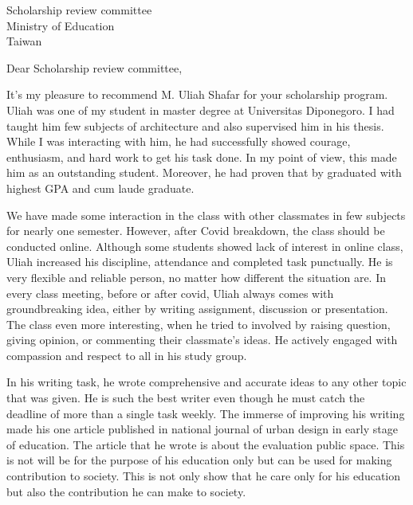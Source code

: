 \documentclass[12pt, a4paper]{simref} %
\begin{document}

\begin{letter}{
	Scholarship review committee\\
	Ministry of Education\\
	Taiwan\\
}


\opening{Dear Scholarship review committee,}

It's my pleasure to recommend M. Uliah Shafar for your scholarship program. Uliah was one of my student in master degree at Universitas Diponegoro. I had taught him few subjects of architecture and also supervised him in his thesis. While I was interacting with him, he had successfully showed courage, enthusiasm, and hard work to get his task done. In my point of view, this made him as an outstanding student. Moreover, he had proven that by graduated with highest GPA and cum laude graduate.

We have made some interaction in the class with other classmates in few subjects for nearly one semester. However, after Covid breakdown, the class should be conducted online. Although some students showed lack of interest in online class, Uliah increased his discipline, attendance and completed task punctually. He is very flexible and reliable person, no matter how different the situation are. In every class meeting, before or after covid, Uliah always comes with groundbreaking idea, either by writing assignment, discussion or presentation. The class even more interesting, when he tried to involved by raising question, giving opinion, or commenting their classmate's ideas. He actively engaged with compassion and respect to all in his study group.

In his writing task, he wrote comprehensive and accurate ideas to any other topic that was given.
He is such the best writer
even though he must catch the deadline of more than a single task weekly. The immerse of improving his writing made his one article published in national journal of urban design in early stage of education. The article that he wrote is about the evaluation public space.
This is not will be for the purpose of his education only but can be used for making contribution to society.
This is not only show that he care only for his education but also the contribution he can make to society.


\end{letter}
\end{document}

